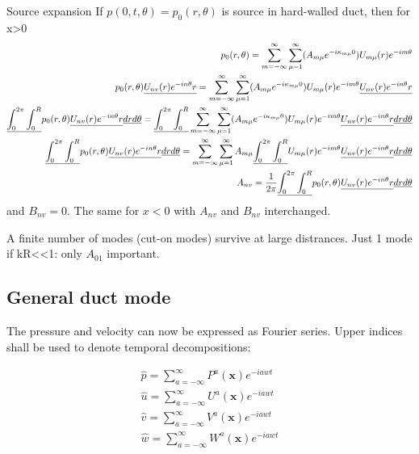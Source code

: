 \documentclass{Note}
\begin{document}
Source expansion
If $p(0,t,\theta)=p_0(r,\theta)$ is source in hard-walled duct, then for x>0
\begin{equation}
\begin{aligned}
p_0(r,\theta)=\sum_{m=-\infty}^\infty \sum_{\mu=1}^\infty (A_{m\mu}e^{-i\kappa_{m\mu}0})U_{m\mu}(r)e^{-im\theta}\\
p_0(r,\theta)\underline{U_{nv}(r)e^{-in\theta}r}=\sum_{m=-\infty}^\infty \sum_{\mu=1}^\infty (A_{m\mu}e^{-i\kappa_{m\mu}0})U_{m\mu}(r)e^{-im\theta}\underline{U_{nv}(r)e^{-in\theta}r}\\
\underline{\int_0^{2\pi}\int_0^R} p_0(r,\theta)\underline{U_{nv}(r)e^{-in\theta}r}\underline{drd\theta}=\underline{\int_0^{2\pi}\int_0^R}\sum_{m=-\infty}^\infty \sum_{\mu=1}^\infty (A_{m\mu}e^{-i\kappa_{m\mu}0})U_{m\mu}(r)e^{-im\theta}\underline{U_{nv}(r)e^{-in\theta}r}\underline{drd\theta}\\
\underline{\int_0^{2\pi}\int_0^R} p_0(r,\theta)\underline{U_{nv}(r)e^{-in\theta}r}\underline{drd\theta}=\sum_{m=-\infty}^\infty \sum_{\mu=1}^\infty A_{m\mu}\underline{\int_0^{2\pi}\int_0^R}U_{m\mu}(r)e^{-im\theta}\underline{U_{nv}(r)e^{-in\theta}r}\underline{drd\theta}\\
A_{nv}={1\over 2\pi}\underline{\int_0^{2\pi}\int_0^R} p_0(r,\theta)\underline{U_{nv}(r)e^{-in\theta}r}\underline{drd\theta}
\end{aligned}
\end{equation}
and $B_{nv}=0$. The same for $x<0$ with $A_{nv}$ and $B_{nv}$ interchanged.

A finite number of modes (cut-on modes) survive at large distrances.
Just 1 mode if kR<<1: only $A_{01}$ important.


\subsection{General duct mode}
The pressure and velocity can now be expressed as Fourier series. Upper indices shall be used to denote temporal decompositions:

\begin{equation}
\begin{aligned}
\widehat{p}=\sum_{a=-\infty}^{\infty}P^a(\textbf{x})e^{-iawt}\\
\widehat{u}=\sum_{a=-\infty}^{\infty}U^a(\textbf{x})e^{-iawt}\\
\widehat{v}=\sum_{a=-\infty}^{\infty}V^a(\textbf{x})e^{-iawt}\\
\widehat{w}=\sum_{a=-\infty}^{\infty}W^a(\textbf{x})e^{-iawt}\\
\end{aligned}
\end{equation}
\end{document}
